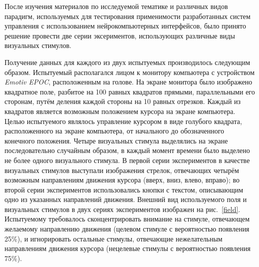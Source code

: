\documentclass[12pt,a4paper,oneside,fleqn,leqno]{article}
\begin{document}
	\par После изучения материалов по исследуемой тематике и различных видов парадигм, используемых для тестирования применимости разработанных систем управления с использованием нейрокомпьютерных интерфейсов, было принято решение провести две серии эксериментов, использующих различные виды визуальных стимулов. 
	\par Получение данных для каждого из двух испытуемых производилось следующим образом. Испытуемый располагался лицом к монитору компьютера с устройством {\it Emotiv EPOC}, расположенным на голове. На экране монитора было изображено квадратное поле, разбитое на 100 равных квадратов прямыми, параллельными его сторонам, путём деления каждой стороны на 10 равных отрезков. Каждый из квадратов является возможным положением курсора на экране компьютера. Целью испытуемого являлось управление курсором в виде голубого квадрата, расположенного на экране компьютера, от начального до обозначенного конечного положения. Четыре визуальных стимула выделялись на экране последовательно случайным образом, в каждый момент времени было выделено не более одного визуального стимула. В первой серии экспериментов в качестве визуальных стимулов выступали изображения стрелок, отвечающих четырём возможным направлениям движения курсора (вверх, вниз, влево, вправо); во второй серии экспериментов использовались кнопки с текстом, описывающим одно из указанных направлений движения. Внешний вид используемого поля и визуальных стимулов в двух сериях экспериментов изображен на рис.~\ref{field}. Испытуемому требовалось сконцентрировать внимание на стимуле, отвечающем желаемому направлению движения (целевом стимуле с вероятностью появления 25\%), и игнорировать остальные стимулы, отвечающие нежелательным направлениям движения курсора (нецелевые стимулы с вероятностью появления 75\%).
\end{document}
